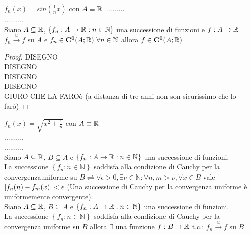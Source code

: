 \example $f_n(x)=sin\left(\frac{1}{n}x\right)$ con $A\equiv \mathbb{R}$
..........\\
..........\\
\proposition
Siano $A\subseteq \mathbb{R}$, $\left\{f_n:A\to \mathbb{R}:n\in\mathbb{N}\right\}$ una successione di funzioni e $f:A\to \mathbb{R}$\\
$f_n\overset{u}{\to}f$ su $A$ e $f_n\in \mathbf{C^{0}}(A; \mathbb{R})\,\,\forall n\in\mathbb{N}$ allora $f\in \mathbf{C^{0}}(A; \mathbb{R})$
\begin{proof}
	DISEGNO\\
	DISEGNO\\
	DISEGNO\\
	DISEGNO\\
	GIURO CHE LA FAROò
	(a distanza di tre anni non son sicurissimo che lo farò)
\end{proof}
\example $f_n(x)=\sqrt{x^2+\frac{1}{n}}$ con $A\equiv \mathbb{R}$\\
..........\\
..........\\
Siano $A\subseteq \mathbb{R}$, $B\subseteq A$ e $\left\{f_n:A\to \mathbb{R}:n\in\mathbb{N}\right\}$ una successione di funzioni.\\
La successione $\left\{f_n:n\in\mathbb{N}\right\}$ soddisfa alla condizione di Cauchy per la convergenzauniforme su $B \rightleftharpoons \forall\epsilon>0, \exists\nu\in\mathbb{N}: \forall n,m>\nu, \forall x \in B$ vale $\left|f_n(n)-f_m(x)\right|<\epsilon$
\proposition
(Una successione di Cauchy per la convergenza uniforme è uniformemente convergente).\\
Siano $A\subseteq \mathbb{R}$, $B\subseteq A$ e $\left\{ f_n:A\to \mathbb{R}:n\in\mathbb{N} \right\}$ una successione di funzioni.\\
La successione $\left\{ f_n:n\in\mathbb{N} \right\}$ soddisfa alla condizione di Cauchy per la convergenza uniforme su $B$ allora $\exists$ una funzione $f:B\to \mathbb{R}$ t.c.: $f_n\overset{u}{\to}f$ su $B$

